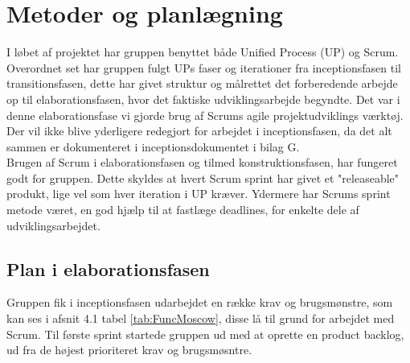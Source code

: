 \section{Metoder og planlægning}
I løbet af projektet har gruppen benyttet både Unified Process (UP) og Scrum. Overordnet set har gruppen fulgt UPs faser og iterationer fra inceptionsfasen til transitionsfasen, dette har givet struktur og målrettet det forberedende arbejde op til elaborationsfasen, hvor det faktiske udviklingsarbejde begyndte. Det var i denne elaborationsfase vi gjorde brug af Scrums agile projektudviklings værktøj. 
Der vil ikke blive yderligere redegjort for arbejdet i inceptionsfasen, da det alt sammen er dokumenteret i inceptionsdokumentet i bilag G.  \\
Brugen af Scrum i elaborationsfasen og tilmed konstruktionsfasen, har fungeret godt for gruppen. Dette skyldes at hvert Scrum sprint har givet et "releaseable" produkt, lige vel som hver iteration i UP kræver. Ydermere har Scrums sprint metode været, en god hjælp til at fastlæge deadlines, for enkelte dele af udviklingsarbejdet.

\subsection{Plan i elaborationsfasen}
Gruppen fik i inceptionsfasen udarbejdet en række krav og brugsmønstre, som kan ses i afsnit 4.1 tabel \ref{tab:FuncMoscow}, disse lå til grund for arbejdet med Scrum. Til første sprint startede gruppen ud med at oprette en product backlog, ud fra de højest prioriteret krav og brugsmøsntre. 